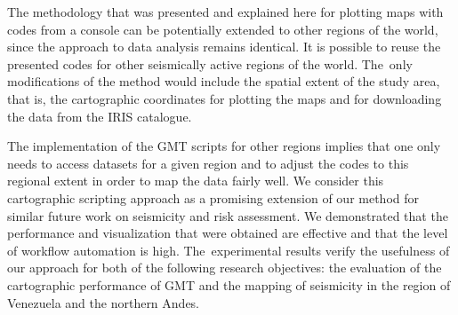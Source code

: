 \documentclass[sustainability,article,accept,pdftex,moreauthors]{Definitions/mdpi}
\begin{document}
{The  methodology that was presented and explained here for plotting maps with codes from a console can be potentially extended to other regions of the world, since the approach to data analysis remains identical. It is possible to reuse the presented codes for other seismically active regions of the world. The~only modifications of the method would include the spatial extent of the study area, that is, the cartographic coordinates for plotting the maps and for downloading the data from the IRIS catalogue. }

{The implementation of the GMT scripts for other regions implies that one  only needs to access datasets for a given region and to adjust the codes to this regional extent in order to map the data fairly well. We consider this cartographic scripting approach as a promising extension of our method for similar future  work on seismicity and risk assessment. We demonstrated that the performance and  visualization that were obtained are   effective and that the level of workflow automation is high. The~experimental results verify the usefulness of our approach for both of the following research objectives: the evaluation of the cartographic performance of GMT and the mapping of  seismicity in the region of Venezuela  and the northern Andes.} 

\vspace{6pt} 





\end{document}
